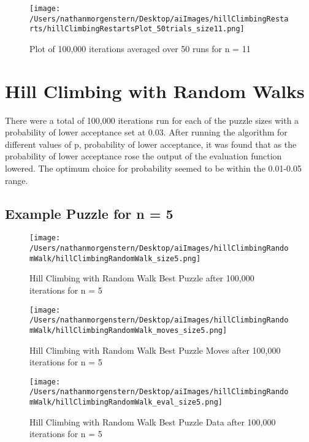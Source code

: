 \documentclass{report}
\begin{document}
	\begin{figure}[H]
	\centering
	\texttt{[image: /Users/nathanmorgenstern/Desktop/aiImages/hillClimbingRestarts/hillClimbingRestartsPlot\_50trials\_size11.png]}
	\caption{Plot of 100,000 iterations averaged over 50 runs for n = 11}
	\label{fig: Plot of 100,000 iterations averaged over 50 runs for n = 11}
	\end{figure}

\newpage
\section{Hill Climbing with Random Walks}
There were a total of 100,000 iterations run for each of the puzzle sizes with a probability of lower acceptance set at 0.03. After running the algorithm for different values of p, probability of lower acceptance, it was found that as the probability of lower acceptance rose the output of the evaluation function lowered. The optimum choice for probability seemed to be within the 0.01-0.05 range.

\subsection{Example Puzzle for n = 5}

	\begin{figure}[H]
	\centering
	\texttt{[image: /Users/nathanmorgenstern/Desktop/aiImages/hillClimbingRandomWalk/hillClimbingRandomWalk\_size5.png]}
	\caption{Hill Climbing with Random Walk Best Puzzle after 100,000 iterations for n = 5} 
	\label{fig: Hill Climbing with Random Walk Best Puzzle after 100,000 iterations for n = 5}
	\end{figure}
	
	\begin{figure}[H]
	\centering
	\texttt{[image: /Users/nathanmorgenstern/Desktop/aiImages/hillClimbingRandomWalk/hillClimbingRandomWalk\_moves\_size5.png]}
	\caption{Hill Climbing with Random Walk Best Puzzle Moves after 100,000 iterations for n = 5} 
	\label{fig: Hill Climbing with Random Walk Best Puzzle Moves after 100,000 iterations for n = 5}
	\end{figure}

	\begin{figure}[H]
	\centering
	\texttt{[image: /Users/nathanmorgenstern/Desktop/aiImages/hillClimbingRandomWalk/hillClimbingRandomWalk\_eval\_size5.png]}
	\caption{Hill Climbing with Random Walk Best Puzzle Data after 100,000 iterations for n = 5} 
	\label{fig: Hill Climbing with Random Walk Best Puzzle Data after 100,000 iterations for n = 5}
	\end{figure}
\end{document}

